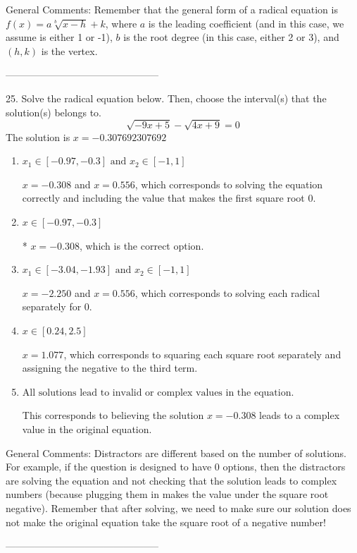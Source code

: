 \documentclass{extbook}[14pt]
\begin{document}
General Comments: Remember that the general form of a radical equation is $ f(x) = a \sqrt[b]{x - h} + k $, where $a$ is the leading coefficient (and in this case, we assume is either 1 or -1), $b$ is the root degree (in this case, either 2 or 3), and $(h, k)$ is the vertex.

-----------------------------------------------

25. Solve the radical equation below. Then, choose the interval(s) that the solution(s) belongs to.
\[ \sqrt{-9 x + 5} - \sqrt{4 x + 9} = 0 \] 
The solution is $ x = -0.307692307692 $ 

\begin{enumerate}[label=\Alph*.] 
\item $ x_1 \in [-0.97, -0.3] \text{ and } x_2 \in [-1,1] $ 

 $x = -0.308$ and $x = 0.556$, which corresponds to solving the equation correctly and including the value that makes the first square root 0. 
\item $ x \in [-0.97,-0.3] $ 

 * $x = -0.308$, which is the correct option. 
\item $ x_1 \in [-3.04, -1.93] \text{ and } x_2 \in [-1,1] $ 

 $x = -2.250$ and $x = 0.556$, which corresponds to solving each radical separately for 0. 
\item $ x \in [0.24,2.5] $ 

 $x = 1.077$, which corresponds to squaring each square root separately and assigning the negative to the third term. 
\item $ \text{All solutions lead to invalid or complex values in the equation.} $ 

 This corresponds to believing the solution $x = -0.308$ leads to a complex value in the original equation. 
\end{enumerate} 
 
General Comments: Distractors are different based on the number of solutions. For example, if the question is designed to have 0 options, then the distractors are solving the equation and not checking that the solution leads to complex numbers (because plugging them in makes the value under the square root negative). Remember that after solving, we need to make sure our solution does not make the original equation take the square root of a negative number!

-----------------------------------------------
\end{document}
